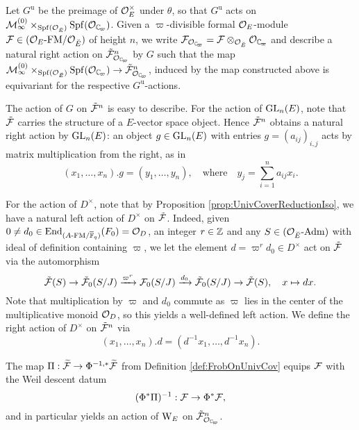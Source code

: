 \documentclass[../main.tex]{subfiles}
\begin{document}
Let $G^{\mathrm u}$ be the preimage of $\mathcal{O}_E^\times$ under $\theta$, so that 
$G^{\mathrm u}$ acts on $\cM_{\infty}^{(0)} \times_{\Spf(\cO_\br E)} \Spf(\cO_\Cp)$. 
Given a $\varpi$-divisible formal $\mathcal{O}_E$-module $\mathcal{F} \in {({\mathcal{O}_E}\textnormal-\allowbreak\mathrm{FM}/{\mathcal{O}_{{\breve {E}}}})}$ of height $n$, we write $\cF_{\cO_\Cp} = \cF \otimes_{\cO_\br E}
\cO_\Cp$ and describe a natural right action on $\tilde \cF_{\cO_\Cp}^n$ by $G$ 
such that the map $\cM_{\infty}^{(0)} \times_{\spf(\cO_\br E)} \Spf(\cO_\Cp) \to
\tilde \cF_{\cO_\Cp}^n$,
induced by the map constructed above is equivariant for the respective
$G^{\mathrm u}$-actions.

The action of $G$ on $\tilde {\mathcal{F}}^n$ is easy to describe. For the action of
$\operatorname{GL}_n(E)$, note that $\tilde {\mathcal{F}}$ carries the structure of a $E$-vector space
object. Hence $\tilde {\mathcal{F}}^n$ obtains a natural right action by $\operatorname{GL}_n(E)$: an
object $g \in \operatorname{GL}_n(E)$ with entries $g = (a_{ij})_{i,j}$ acts by matrix
multiplication from the right, as in 
\begin{equation}\label{eq:UnivCoverGLnAction}
  (x_1, \dots, x_n).g = (y_1, \dots, y_n), \quad
  \text{where} \quad y_j = \sum_{i=1}^n a_{ij} x_i. 
\end{equation}

For the action of $D^\times$, note that by Proposition
\ref{prop:UnivCoverReductionIso}, we have 
a natural left action of $D^\times$ on $\tilde {\mathcal{F}}$. 
Indeed, given $0 \neq d_0 \in \operatorname{End}_{{({A}\textnormal-\allowbreak\mathrm{FM}/{{\overline {\mathbb{F}}_q}})}}(F_0) = \mathcal{O}_D$, an
integer $r \in \mathbb{Z}$ and any $S \in {({\mathcal{O}_{\breve {E}}}\textnormal-\allowbreak\mathrm{Adm})}$ with ideal of definition
containing $\varpi$, 
we let the element $d = \varpi^r d_0 \in D^\times$ act on $\tilde {\mathcal{F}}$ via the
automorphism
\begin{equation*}
  \tilde {\mathcal{F}}(S) \to \tilde {\mathcal{F}}_0(S/J) \xrightarrow{\varpi^{r}} \mathcal{F}_0(S/J) \xrightarrow{d_0}
  \tilde {\mathcal{F}}_0(S/J) \to \tilde {\mathcal{F}}(S), \quad x \mapsto dx.
\end{equation*}
Note that multiplication by $\varpi$ and $d_0$ commute as $\varpi$ lies in the 
center of the multiplicative monoid $\mathcal{O}_D$, so this yields a well-defined
left action. We define the right action of $D^\times$ on $\tilde {\mathcal{F}}^n$ via
\begin{equation*}
  (x_1, \dots, x_n).d = (d^{-1} x_1, \dots, d^{-1} x_n).
\end{equation*}


The map $\Pi: \widetilde{\mathcal{F}} \to \Phi^{-1,*}\widetilde{\mathcal{F}}$ from Definition 
\ref{def:FrobOnUnivCov} equips $\mathcal{F}$ with the Weil descent datum
\begin{equation*}
  (\Phi^*{\Pi})^{-1}: \mathcal{F} \to \Phi^*\mathcal{F},
\end{equation*}
and in particular yields an action of $\mathrm W_E$ on $\tilde \cF_{\cO_\Cp}^n$. 
\end{document}
